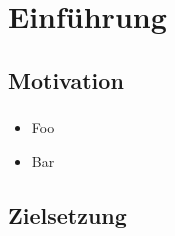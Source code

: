 \section{Einführung}


\subsection{Motivation}

\begin{frame}
    \frametitle{\insertsubsection} 

    \begin{itemize}%
    	\setlength\itemsep{1em}
        \item Foo
        \item Bar
    \end{itemize}
\end{frame}


\subsection{Zielsetzung}
